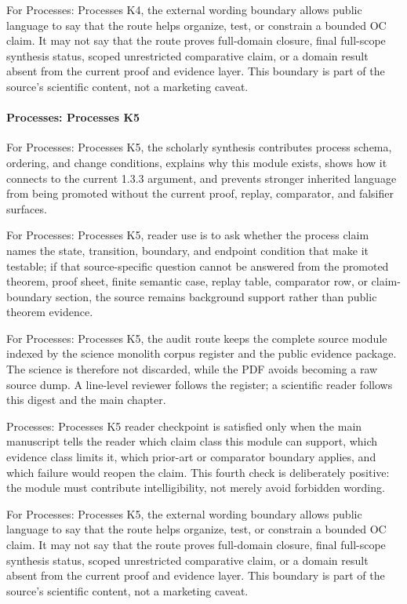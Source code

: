 For Processes: Processes K4, the external wording boundary allows public language to say that the route helps organize, test, or constrain a bounded OC claim. It may not say that the route proves full-domain closure, final full-scope synthesis status, scoped unrestricted comparative claim, or a domain result absent from the current proof and evidence layer. This boundary is part of the source's scientific content, not a marketing caveat.


\paragraph{Processes: Processes K5}

For Processes: Processes K5, the scholarly synthesis contributes process schema, ordering, and change conditions, explains why this module exists, shows how it connects to the current 1.3.3 argument, and prevents stronger inherited language from being promoted without the current proof, replay, comparator, and falsifier surfaces.


For Processes: Processes K5, reader use is to ask whether the process claim names the state, transition, boundary, and endpoint condition that make it testable; if that source-specific question cannot be answered from the promoted theorem, proof sheet, finite semantic case, replay table, comparator row, or claim-boundary section, the source remains background support rather than public theorem evidence.


For Processes: Processes K5, the audit route keeps the complete source module indexed by the science monolith corpus register and the public evidence package. The science is therefore not discarded, while the PDF avoids becoming a raw source dump. A line-level reviewer follows the register; a scientific reader follows this digest and the main chapter.


Processes: Processes K5 reader checkpoint is satisfied only when the main manuscript tells the reader which claim class this module can support, which evidence class limits it, which prior-art or comparator boundary applies, and which failure would reopen the claim. This fourth check is deliberately positive: the module must contribute intelligibility, not merely avoid forbidden wording.


For Processes: Processes K5, the external wording boundary allows public language to say that the route helps organize, test, or constrain a bounded OC claim. It may not say that the route proves full-domain closure, final full-scope synthesis status, scoped unrestricted comparative claim, or a domain result absent from the current proof and evidence layer. This boundary is part of the source's scientific content, not a marketing caveat.


